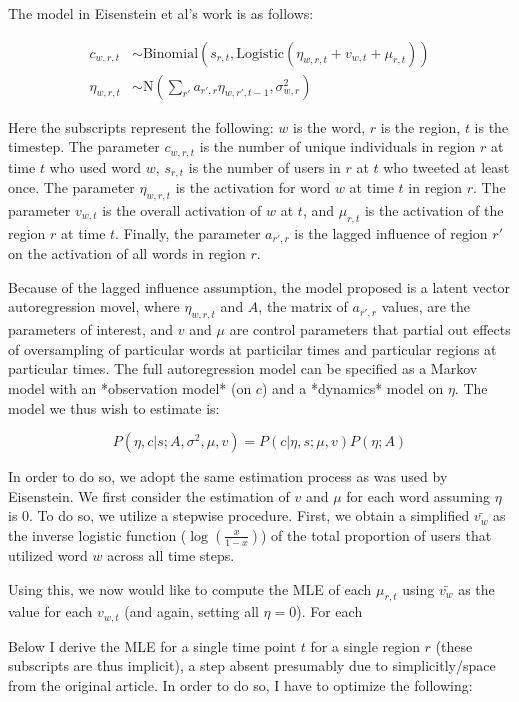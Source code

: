 \documentclass[11pt]{article}
\begin{document}
The model in Eisenstein et al's work is as follows:

\begin{align}
c_{w,r,t} &\sim \mathrm{Binomial}(s_{r,t}, \mathrm{Logistic}(\eta_{w,r,t} + v_{w,t} + \mu_{r,t})) \\
\eta_{w,r,t} &\sim \mathrm{N}(\sum_{r'} a_{r',r}\eta_{w,r',t-1}, \sigma^2_{w,r}) 
\end{align}

Here the subscripts represent the following: $w$ is the word, $r$ is the region, $t$ is the timestep. The parameter $c_{w,r,t}$ is the number of unique individuals in region $r$ at time $t$ who used word $w$, $s_{r,t}$ is the number of users in $r$ at $t$ who tweeted at least once. The parameter $\eta_{w,r,t}$ is the activation for word $w$ at time $t$ in region $r$. The parameter $v_{w,t}$ is the overall activation of $w$ at $t$, and $\mu_{r,t}$ is the activation of the region $r$ at time $t$.  Finally, the parameter $a_{r',r}$ is the lagged influence of region $r'$ on the activation of all words in region $r$.

Because of the lagged influence assumption, the model proposed is a latent vector autoregression movel, where $\eta_{w,r,t}$ and $A$, the matrix of $a_{r',r}$ values, are the parameters of interest, and $v$ and $\mu$ are control parameters that partial out effects of oversampling of particular words at particilar times and particular regions at particular times. The full autoregression model can be specified as a Markov model with an *observation model* (on $c$) and a *dynamics*  model on $\eta$. The model we thus wish to estimate is:

\begin{equation}
	P(\eta,c|s; A, \sigma^2,\mu,v) = P(c | \eta, s; \mu, v) P(\eta; A)
\end{equation}


In order to do so, we adopt the same estimation process as was used by Eisenstein.  We first consider the estimation of $v$ and $\mu$ for each word assuming $\eta$ is 0.  To do so, we utilize a stepwise procedure.  First, we obtain a simplified $\bar{v_w}$ as the inverse logistic function ($\log(\frac{x}{1-x})$) of the total proportion of users that utilized word $w$ across all time steps.

Using this, we now would like to compute the MLE of each $\mu_{r,t}$ using $\bar{v_w}$ as the value for each $v_{w,t}$ (and again, setting all $\eta = 0$).  For each 

 Below I derive the MLE for a single time point $t$ for a single region $r$ (these subscripts are thus implicit), a step absent presumably due to simplicitly/space from the original article.  In order to do so, I have to optimize the following:
\end{document}
